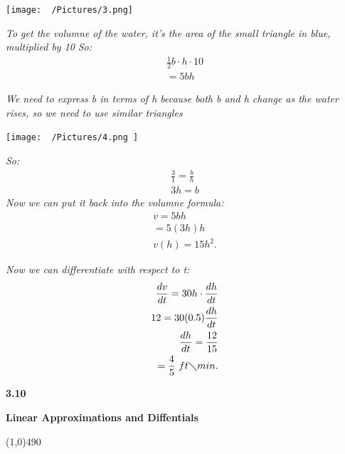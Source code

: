 \documentclass{report}
\begin{document}
    \bigbreak \noindent 
    \begin{center}
      \texttt{[image: ~/Pictures/3.png]}
    \end{center}

    \bigbreak \noindent 
    \textit{To get the volumne of the water, it's the area of the small triangle in blue,
      multiplied by 10
     }
     \bigbreak \noindent
     \textit{So:}
     \begin{align*}
       \frac{1}{2}b \cdot h  \cdot 10 \\
       = 5bh
     \end{align*}
  
    \bigbreak \noindent 
    \textit{We need to express b in terms of h because both b and h change as the water rises, so we need to use similar triangles}

    \bigbreak \noindent 
    \begin{center}
      \texttt{[image:  ~/Pictures/4.png ]}
    \end{center}
    \bigbreak \noindent
    \textit{So:}
    \begin{align*}
      \frac{3}{1} = \frac{b}{h} \\ 
      3h = b
    \end{align*}
    \bigbreak \noindent 
    \textit{Now we can put it back into the volumne formula:}
    \begin{align*}
      v = 5bh \\
      = 5(3h)h \\
      v(h) =15h^{2}
    .\end{align*}

    \bigbreak \noindent 
    \textit{Now we can differentiate with respect to t:}
    \begin{align*}
      \frac{dv}{dt} = 30h \cdot \frac{dh}{dt} \\
      12 = 30(0.5) \frac{dh}{dt} \\ 
      \frac{dh}{dt} = \frac{12}{15} \\
      = \frac{4}{5}\ ft \diagdown min
    .\end{align*}

    \pagebreak \bigbreak \noindent
    \begin{Large}
        \begin{mdframed}
            \begin{center}
                \textbf{3.10}
            \end{center}
        \end{mdframed}
    \end{Large}
    \begin{Large}
        \begin{center}
            \textbf{Linear Approximations and Diffentials}
        \end{center}
    \end{Large}
    \line(1,0){490}
    
\end{document}
